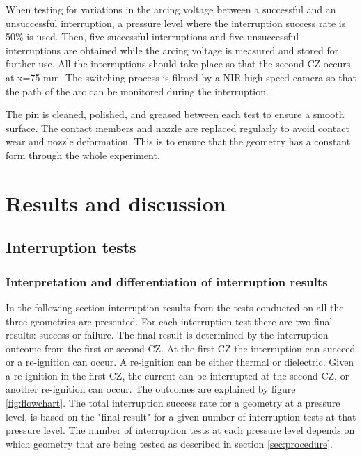 \documentclass[10pt,b5paper,twoside]{article}
\begin{document}
When testing for variations in the arcing voltage between a successful and an unsuccessful interruption, a pressure level where the interruption success rate is 50\% is used. Then, five successful interruptions and five unsuccessful interruptions are obtained while the arcing voltage is measured and stored for further use. All the interruptions should take place so that the second CZ occurs at x=75 mm. The switching process is filmed by a NIR high-speed camera so that the path of the arc can be monitored during the interruption.

The pin is cleaned, polished, and greased between each test to ensure a smooth surface. The contact members and nozzle are replaced regularly to avoid contact wear and nozzle deformation. This is to ensure that the geometry has a constant form through the whole experiment.
\cleardoublepage

\section{Results and discussion}
\subsection{Interruption tests} \label{sec:interruptionTests}
\subsubsection{Interpretation and differentiation of interruption results}
In the following section interruption results from the tests conducted on all the three geometries are presented. For each interruption test there are two final results: success or failure. The final result is determined by the interruption outcome from the first or second CZ. At the first CZ the interruption can succeed or a re-ignition can occur. A re-ignition can be either thermal or dielectric. Given a re-ignition in the first CZ, the current can be interrupted at the second CZ, or another re-ignition can occur. The outcomes are explained by figure \ref{fig:flowchart}. The total interruption success rate for a geometry at a pressure level, is based on the "final result" for a given number of interruption tests at that pressure level. The number of interruption tests at each pressure level depends on which geometry that are being tested as described in section \ref{sec:procedure}. 
\end{document}
